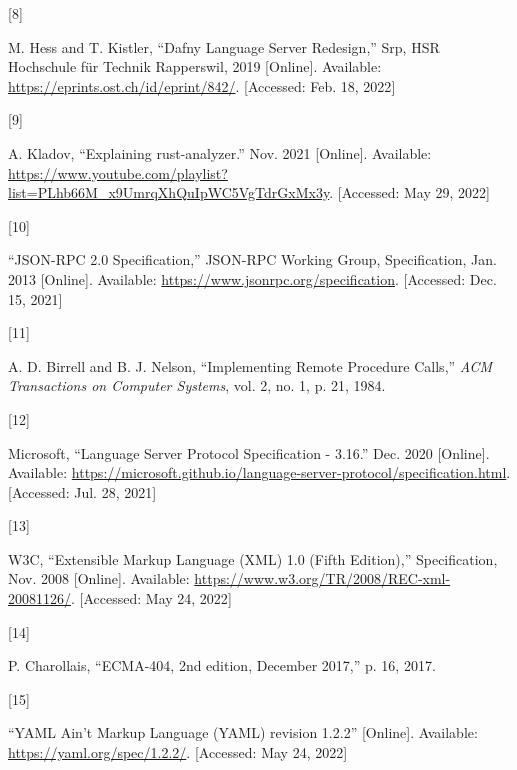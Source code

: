 \documentclass[
  a4paper,
  bibtex,
  english,
  nomenclature]{kthlatex/kththesis/kththesis}
\newlength{\cslhangindent}
\newlength{\csllabelwidth}
\newlength{\cslentryspacingunit} %
\newenvironment{CSLReferences}[2] %
 {%
  \setlength{\parindent}{0pt}
  \ifodd #1
  \let\oldpar\par
  \def\par{\hangindent=\cslhangindent\oldpar}
  \fi
  \setlength{\parskip}{#2\cslentryspacingunit}
 }%
 {}
\newcommand{\CSLLeftMargin}[1]{\parbox[t]{\csllabelwidth}{#1}}
\newcommand{\CSLRightInline}[1]{\parbox[t]{\linewidth - \csllabelwidth}{#1}\break}
\begin{document}
\begin{CSLReferences}{0}{0}
\leavevmode{}%
\CSLLeftMargin{{[}8{]} }
\CSLRightInline{M. Hess and T. Kistler, {``Dafny {Language Server
Redesign},''} Srp, HSR Hochschule für Technik Rapperswil, 2019
{[}Online{]}. Available: \url{https://eprints.ost.ch/id/eprint/842/}.
{[}Accessed: Feb. 18, 2022{]}}

\leavevmode{}%
\CSLLeftMargin{{[}9{]} }
\CSLRightInline{A. Kladov, {``Explaining rust-analyzer.''} Nov. 2021
{[}Online{]}. Available:
\url{https://www.youtube.com/playlist?list=PLhb66M_x9UmrqXhQuIpWC5VgTdrGxMx3y}.
{[}Accessed: May 29, 2022{]}}

\leavevmode{}%
\CSLLeftMargin{{[}10{]} }
\CSLRightInline{{``{JSON-RPC} 2.0 {Specification},''} {JSON-RPC Working
Group}, Specification, Jan. 2013 {[}Online{]}. Available:
\url{https://www.jsonrpc.org/specification}. {[}Accessed: Dec. 15,
2021{]}}

\leavevmode{}%
\CSLLeftMargin{{[}11{]} }
\CSLRightInline{A. D. Birrell and B. J. Nelson, {``Implementing {Remote
Procedure Calls},''} \emph{ACM Transactions on Computer Systems}, vol.
2, no. 1, p. 21, 1984. }

\leavevmode{}%
\CSLLeftMargin{{[}12{]} }
\CSLRightInline{Microsoft, {``Language {Server Protocol Specification} -
3.16.''} Dec. 2020 {[}Online{]}. Available:
\url{https://microsoft.github.io/language-server-protocol/specification.html}.
{[}Accessed: Jul. 28, 2021{]}}

\leavevmode{}%
\CSLLeftMargin{{[}13{]} }
\CSLRightInline{W3C, {``Extensible {Markup Language} ({XML}) 1.0 ({Fifth
Edition}),''} Specification, Nov. 2008 {[}Online{]}. Available:
\url{https://www.w3.org/TR/2008/REC-xml-20081126/}. {[}Accessed: May 24,
2022{]}}

\leavevmode{}%
\CSLLeftMargin{{[}14{]} }
\CSLRightInline{P. Charollais, {``{ECMA-404}, 2nd edition, {December}
2017,''} p. 16, 2017. }

\leavevmode{}%
\CSLLeftMargin{{[}15{]} }
\CSLRightInline{{``{YAML Ain}'t {Markup Language}
({YAML}\texttrademark ) revision 1.2.2''} {[}Online{]}. Available:
\url{https://yaml.org/spec/1.2.2/}. {[}Accessed: May 24, 2022{]}}


\end{CSLReferences}
\end{document}
